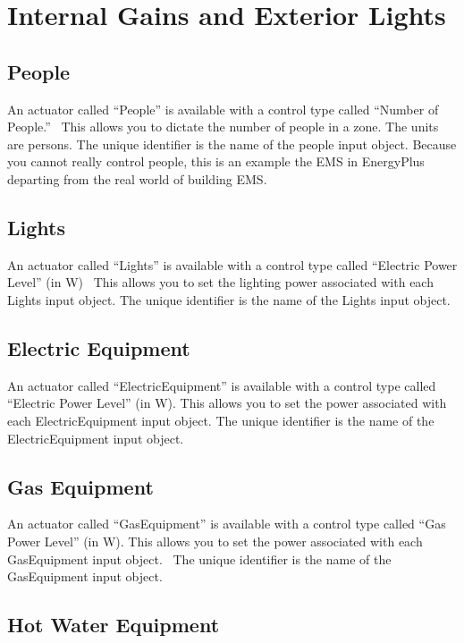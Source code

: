 \section{Internal Gains and Exterior Lights}\label{internal-gains-and-exterior-lights}

\subsection{People}\label{people}

An actuator called ``People'' is available with a control type called ``Number of People.''~ This allows you to dictate the number of people in a zone. The units are persons. The unique identifier is the name of the people input object. Because you cannot really control people, this is an example the EMS in EnergyPlus departing from the real world of building EMS.

\subsection{Lights}\label{lights}

An actuator called ``Lights'' is available with a control type called ``Electric Power Level'' (in W)~ This allows you to set the lighting power associated with each Lights input object. The unique identifier is the name of the Lights input object.

\subsection{Electric Equipment}\label{electric-equipment}

An actuator called ``ElectricEquipment'' is available with a control type called ``Electric Power Level'' (in W). This allows you to set the power associated with each ElectricEquipment input object. The unique identifier is the name of the ElectricEquipment input object.

\subsection{Gas Equipment}\label{gas-equipment}

An actuator called ``GasEquipment'' is available with a control type called ``Gas Power Level'' (in W). This allows you to set the power associated with each GasEquipment input object.~ The unique identifier is the name of the GasEquipment input object.

\subsection{Hot Water Equipment}\label{hot-water-equipment}

